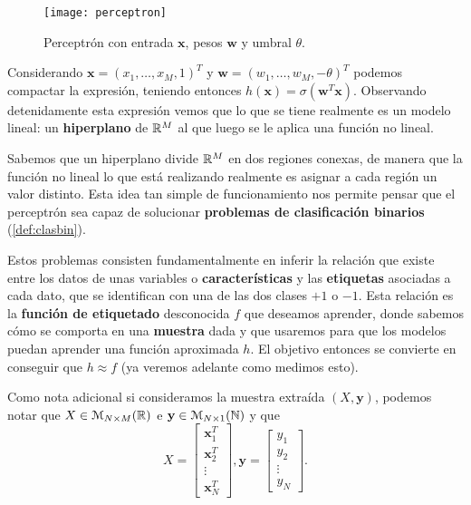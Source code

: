 \begin{figure}[htpb]
  \centering
  \texttt{[image: perceptron]}
  \caption{Perceptrón con entrada $\textbf{x}$, pesos $\textbf{w}$ y umbral $\theta$.}
  \label{fig:perceptron}
\end{figure}

Considerando $\textbf{x} = (x_1, \ldots, x_M, 1)^T$ y $\textbf{w} = (w_1, \ldots, w_M, -\theta)^T$ podemos compactar la expresión, teniendo entonces $h(\textbf{x}) = \sigma(\textbf{w}^T \textbf{x})$. Observando detenidamente esta expresión vemos que lo que se tiene realmente es un modelo lineal: un \textbf{hiperplano} de $\mathbb{R}^{M}$ al que luego se le aplica una función no lineal.

Sabemos que un hiperplano divide $\mathbb{R}^{M}$ en dos regiones conexas, de manera que la función no lineal lo que está realizando realmente es asignar a cada región un valor distinto. Esta idea tan simple de funcionamiento nos permite pensar que el perceptrón sea capaz de solucionar \textbf{problemas de clasificación binarios}  (\autoref{def:clasbin}).

Estos problemas consisten fundamentalmente en inferir la relación que existe entre los datos de unas variables o \textbf{características} y las \textbf{etiquetas} asociadas a cada dato, que se identifican con una de las dos clases $+1$ o $-1$. Esta relación es la \textbf{función de etiquetado} desconocida $f$ que deseamos aprender, donde sabemos cómo se comporta en una \textbf{muestra} dada y que usaremos para que los modelos puedan aprender una función aproximada $h$. El objetivo entonces se convierte en conseguir que $h \approx f$ (ya veremos adelante como medimos esto).

Como nota adicional si consideramos la muestra extraída $(X, \textbf{y})$, podemos notar que $X \in \mathcal{M}_{N \times M}(\mathbb{R})$ e $\textbf{y} \in \mathcal{M}_{N \times 1}(\mathbb{N})$ y que
$$ X = \begin{bmatrix} \textbf{x}_1^T \\ \textbf{x}_2^T \\ \vdots \\ \textbf{x}_N^T \end{bmatrix}, \textbf{y} = \begin{bmatrix} y_1 \\ y_2 \\ \vdots \\ y_{N} \end{bmatrix}.$$

